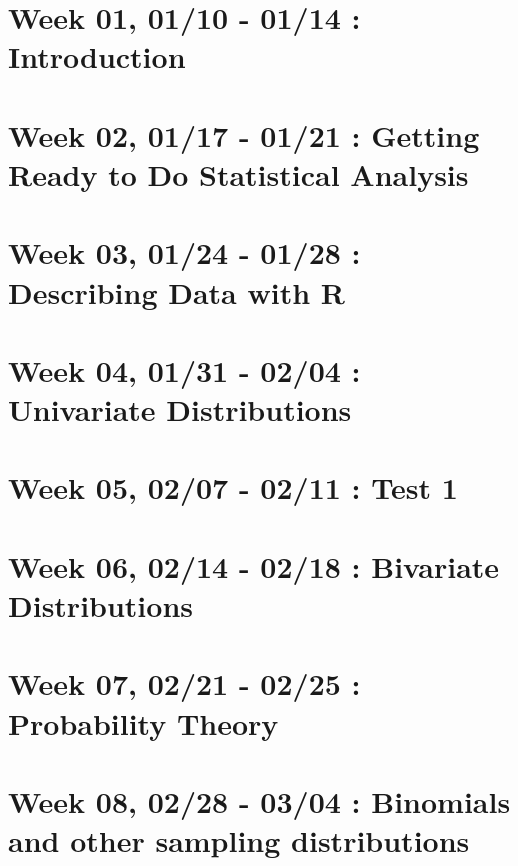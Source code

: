 \documentclass[
]{book}
\begin{document}
\hypertarget{week-01-0110---0114-introduction}{%
\section{Week 01, 01/10 - 01/14 : Introduction}\label{week-01-0110---0114-introduction}}

\hypertarget{week-02-0117---0121-getting-ready-to-do-statistical-analysis}{%
\section{Week 02, 01/17 - 01/21 : Getting Ready to Do Statistical Analysis}\label{week-02-0117---0121-getting-ready-to-do-statistical-analysis}}

\hypertarget{week-03-0124---0128-describing-data-with-r}{%
\section{Week 03, 01/24 - 01/28 : Describing Data with R}\label{week-03-0124---0128-describing-data-with-r}}

\hypertarget{week-04-0131---0204-univariate-distributions}{%
\section{Week 04, 01/31 - 02/04 : Univariate Distributions}\label{week-04-0131---0204-univariate-distributions}}

\hypertarget{week-05-0207---0211-test-1}{%
\section{Week 05, 02/07 - 02/11 : Test 1}\label{week-05-0207---0211-test-1}}

\hypertarget{week-06-0214---0218-bivariate-distributions}{%
\section{Week 06, 02/14 - 02/18 : Bivariate Distributions}\label{week-06-0214---0218-bivariate-distributions}}

\hypertarget{week-07-0221---0225-probability-theory}{%
\section{Week 07, 02/21 - 02/25 : Probability Theory}\label{week-07-0221---0225-probability-theory}}

\hypertarget{week-08-0228---0304-binomials-and-other-sampling-distributions}{%
\section{Week 08, 02/28 - 03/04 : Binomials and other sampling distributions}\label{week-08-0228---0304-binomials-and-other-sampling-distributions}}
\end{document}
